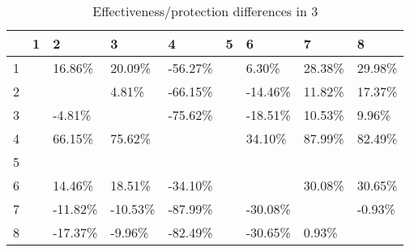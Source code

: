 \begin{table}[ht]
\centering
\begin{tabular}{rllllllll}
  \hline
 & 1 & 2 & 3 & 4 & 5 & 6 & 7 & 8 \\ 
  \hline
1 &  & 16.86\% & 20.09\% & -56.27\% &  & 6.30\% & 28.38\% & 29.98\% \\ 
  2 &  &  & 4.81\% & -66.15\% &  & -14.46\% & 11.82\% & 17.37\% \\ 
  3 &  & -4.81\% &  & -75.62\% &  & -18.51\% & 10.53\% & 9.96\% \\ 
  4 &  & 66.15\% & 75.62\% &  &  & 34.10\% & 87.99\% & 82.49\% \\ 
  5 &  &  &  &  &  &  &  &  \\ 
  6 &  & 14.46\% & 18.51\% & -34.10\% &  &  & 30.08\% & 30.65\% \\ 
  7 &  & -11.82\% & -10.53\% & -87.99\% &  & -30.08\% &  & -0.93\% \\ 
  8 &  & -17.37\% & -9.96\% & -82.49\% &  & -30.65\% & 0.93\% &  \\ 
   \hline
\end{tabular}
\caption{Effectiveness/protection differences in  3} 
\end{table}
